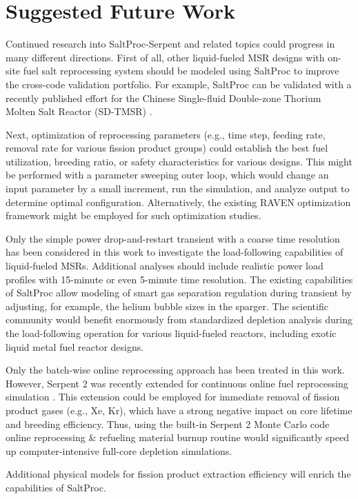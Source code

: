 \section{Suggested Future Work}
Continued research into SaltProc-Serpent and related topics could progress
in many different directions. First of all, other liquid-fueled 
\gls{MSR} designs with on-site fuel salt reprocessing system should be modeled 
using SaltProc to improve the cross-code validation portfolio. For example, 
SaltProc can be validated with a recently published effort for the Chinese 
Single-fluid Double-zone Thorium Molten Salt Reactor (SD-TMSR) 
\cite{ASHRAF2019107115}.

Next, optimization of reprocessing parameters (e.g., time step, feeding rate, 
removal rate for various fission product groups) could establish the best fuel 
utilization, breeding ratio, or safety characteristics for various designs. 
This might be performed with a parameter sweeping outer loop, which would 
change an input parameter by a small increment, run the simulation, and 
analyze output to determine optimal configuration. Alternatively, the existing 
RAVEN optimization framework \cite{alfonsi_raven_2016} might be employed for 
such optimization studies.

Only the simple power drop-and-restart transient with a coarse time resolution 
has been considered in this work to investigate the load-following 
capabilities of liquid-fueled \glspl{MSR}. Additional analyses should include 
realistic power load profiles with 15-minute or even 5-minute time resolution. 
The existing capabilities of SaltProc allow modeling of smart gas separation 
regulation during transient by adjusting, for example, the helium bubble sizes 
in the sparger. The scientific community would benefit enormously from 
standardized depletion analysis during the load-following operation for 
various liquid-fueled reactors, including exotic liquid metal fuel reactor 
designs.

Only the batch-wise online reprocessing approach has been treated in this 
work. However, Serpent 2 was recently extended for continuous online fuel 
reprocessing simulation \cite{aufiero_extended_2013}. This extension could be 
employed for immediate removal of fission product gases (e.g., Xe, Kr), which 
have a strong negative impact on core lifetime and breeding efficiency. 
Thus, using the built-in Serpent 2 Monte Carlo code online reprocessing \& 
refueling material burnup routine would significantly speed up 
computer-intensive full-core depletion simulations.


Additional physical models for fission product extraction efficiency will 
enrich the capabilities of SaltProc.


